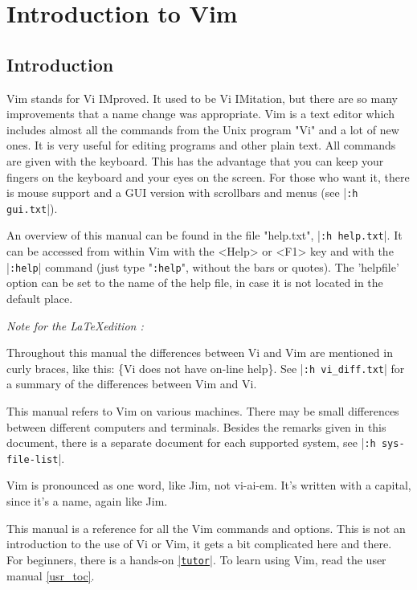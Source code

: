 \section{Introduction to Vim}
\label{ref}
\label{reference}
\subsection{Introduction}
\label{intro}
Vim stands for Vi IMproved.
It used to be Vi IMitation, but there are so many improvements that a name change was appropriate.
Vim is a text editor which includes almost all the commands from the Unix program "Vi" and a lot of new ones.
It is very useful for editing programs and other plain text.
All commands are given with the keyboard.
This has the advantage that you can keep your fingers on the keyboard and your eyes on the screen.
For those who want it, there is mouse support and a GUI version with scrollbars and menus (see |\verb!:h gui.txt!|).

An overview of this manual can be found in the file "help.txt", |\verb!:h help.txt!|.
It can be accessed from within Vim with the <Help> or <F1> key and with the |\verb!:help!| command (just type "\verb!:help!", without the bars or quotes).
The 'helpfile' option can be set to the name of the help file, in case it is not located in the default place.

\textit{Note for the \LaTeX edition : }

Throughout this manual the differences between Vi and Vim are mentioned in curly braces, like this: \{Vi does not have on-line help\}.
See |\verb!:h vi_diff.txt!| for a summary of the differences between Vim and Vi.

This manual refers to Vim on various machines.
There may be small differences between different computers and terminals.
Besides the remarks given in this document, there is a separate document for each supported system, see |\verb!:h sys-file-list!|.

\label{pronounce}
Vim is pronounced as one word, like Jim, not vi-ai-em.
It's written with a capital, since it's a name, again like Jim.

This manual is a reference for all the Vim commands and options.
This is not an introduction to the use of Vi or Vim, it gets a bit complicated here and there.
For beginners, there is a hands-on \hyperref[tutor]{|\texttt{tutor}|}.
To learn using Vim, read the user manual \ref{usr_toc}.

